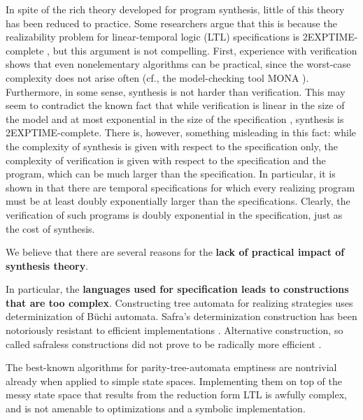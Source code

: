 In spite of the rich theory developed for program synthesis, little of
this theory has been reduced to practice. 
Some researchers argue that this is because the realizability problem
for linear-temporal logic (LTL) specifications is 2EXPTIME-complete
\cite{PnRo89,Rosner92}, but this argument is not compelling. First,
experience with verification shows that even nonelementary algorithms
can be practical, since the worst-case complexity does not arise often
(cf., the model-checking tool MONA \cite{ElgaardKM98}). Furthermore,
in some sense, synthesis is not harder than verification. This may
seem to contradict the known fact that while verification is linear in
the size of the model and at most exponential in the size of the
specification \cite{ClarkeGP:99-ModelChecking}, synthesis is
2EXPTIME-complete. There is, however, something misleading in this
fact: while the complexity of synthesis is given with respect to the
specification only, the complexity of verification is given with
respect to the specification and the program, which can be much larger
than the specification. In particular, it is shown in \cite{Rosner92}
that there are temporal specifications for which every realizing
program must be at least doubly exponentially larger than the
specifications. Clearly, the verification of such programs is doubly
exponential in the specification, just as the cost of synthesis.


We believe that there are several reasons for the \textbf{lack of practical impact
of synthesis theory}.  

In particular, the
\textbf{languages used for specification leads to constructions that are too complex}.
%
Constructing tree automata for realizing strategies uses
determinization of B\"uchi automata. Safra's determinization
construction has been notoriously resistant to efficient
implementations \cite{TsaiFVT14}. Alternative construction, so called
safraless constructions \cite{KupfermanV05,KupfermanPV06} did not
prove to be radically more efficient \cite{FiliotJR11}.

The best-known algorithms for parity-tree-automata emptiness
\cite{JurdzinskiPZ08} are nontrivial already when applied to simple
state spaces. Implementing them on top of the messy state space that
results from the reduction form LTL is awfully complex, and is not
amenable to optimizations and a symbolic implementation.

